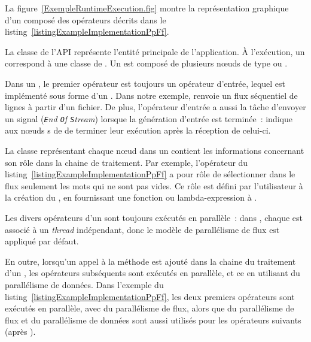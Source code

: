 

La figure~\ref{ExempleRuntimeExecution.fig} montre la repr\'esentation graphique d'un  compos\'e des op\'erateurs d\'ecrits dans le listing~\ref{listingExampleImplementationPpFf}.
 

La classe  de l'API repr\'esente l'entit\'e principale de l'application. \`A l'ex\'ecution, un  correspond \`a une classe  de . Un  est compos\'e de plusieurs nœuds de type  ou . 

Dans un , le premier op\'erateur est toujours un op\'erateur d'entr\'ee, lequel est impl\'ement\'e sous forme d'un . Dans notre exemple,  renvoie un flux s\'equentiel de lignes \`a partir d'un fichier. De plus, l'op\'erateur d'entr\'ee a aussi la t\^ache d'envoyer un signal  (\emph{\texttt{E}nd \texttt{O}f \texttt{S}tream}) lorsque la g\'en\'eration d'entr\'ee est termin\'ee~:  indique aux nœuds s de  de terminer leur ex\'ecution apr\`es la r\'eception de celui-ci.

La classe repr\'esentant chaque nœud dans un  contient les informations concernant son r\^ole dans la chaine de traitement. Par exemple, l'op\'erateur  du listing~\ref{listingExampleImplementationPpFf} a pour r\^ole de s\'electionner dans le flux seulement les mots qui ne sont pas vides. Ce r\^ole est d\'efini par l'utilisateur \`a la cr\'eation du , en fournissant une fonction ou lambda-expression \`a .


Les divers op\'erateurs d'un  sont toujours ex\'ecut\'es en parall\`ele~: dans , chaque  est associ\'e \`a un \emph{thread} ind\'ependant, donc le mod\`ele de parall\'elisme de flux est appliqu\'e par d\'efaut. 

En outre, lorsqu'un appel \`a la m\'ethode  est ajout\'e dans la chaine du traitement d'un , les op\'erateurs subs\'equents sont ex\'ecut\'es en parall\`ele, et ce en utilisant du parall\'elisme de donn\'ees. Dans l'exemple du listing~\ref{listingExampleImplementationPpFf}, les deux premiers op\'erateurs sont ex\'ecut\'es en parall\`ele, avec du parall\'elisme de flux, alors que du parall\'elisme de flux et du parall\'elisme de donn\'ees sont aussi utilis\'es pour les op\'erateurs suivants (apr\`es ). 

